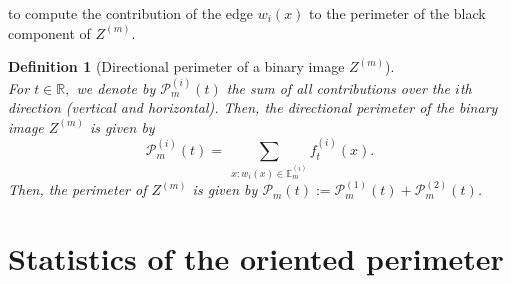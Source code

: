 \documentclass[12pt]{article}
\theoremstyle{Theorem}
\newtheorem{Definition}[Theorem]{Definition}
\begin{document}
to compute the contribution of the edge $w_i(x)$ to the perimeter of the black component of $Z^{\scriptscriptstyle (m)}$.
\begin{Definition}[Directional perimeter of a binary image $Z^{\scriptscriptstyle (m)}$]\label{defPerimetre}~\\
For $t\in \mathbb{R},$ we denote by $\mathcal{P}_{m}^{\scriptscriptstyle (i)}(t)$ the sum of all contributions over the $i$th direction (vertical and horizontal). Then, the directional perimeter of the binary image $Z^{\scriptscriptstyle (m)}$ is given by
\begin{equation}
\mathcal{P}_{m}^{\scriptscriptstyle (i)}(t) =~\sum_{\scriptscriptstyle x: w_{i}(x) \in \mathbb{E}^{\scriptscriptstyle (i)}_{m}} f_{t}^{\scriptscriptstyle (i)}(x).
 \label{eq:6}
\end{equation}
Then, the perimeter of $Z^{\scriptscriptstyle (m)}$ is given by $\mathcal{P}_{m}(t) := \mathcal{P}_{m}^{\scriptscriptstyle (1)}(t) + \mathcal{P}_{m}^{\scriptscriptstyle (2)}(t)$.
\end{Definition}
\section{Statistics of the oriented perimeter} 
\end{document}
